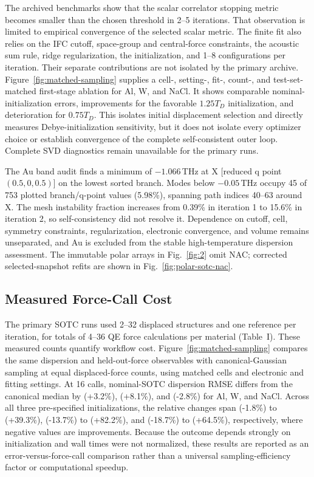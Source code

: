 \documentclass[aps,prb,reprint,amsmath,amssymb,floatfix]{revtex4-2}
\begin{document}
The archived benchmarks show that the scalar correlator stopping metric becomes
smaller than the chosen threshold in 2--5 iterations. That observation is
limited to empirical convergence of the selected scalar metric. The
finite fit also relies on the IFC cutoff, space-group and central-force
constraints, the acoustic sum rule, ridge regularization, the initialization,
and 1--8 configurations per iteration. Their separate contributions are not
isolated by the primary archive. Figure~\ref{fig:matched-sampling} supplies a
cell-, setting-, fit-, count-, and test-set-matched first-stage ablation for Al,
W, and NaCl. It shows comparable nominal-initialization errors, improvements
for the favorable \(1.25T_D\) initialization, and deterioration for
\(0.75T_D\). This isolates initial displacement selection and directly measures
Debye-initialization sensitivity, but it does not isolate every optimizer
choice or establish convergence of the complete self-consistent outer loop.
Complete SVD diagnostics remain unavailable for the primary runs.

The Au band audit finds a minimum of \(-1.066\)\,THz at X
[reduced q point \((0.5,0,0.5)\)] on the lowest sorted branch. Modes below
\(-0.05\)\,THz occupy 45 of 753 plotted branch/q-point values (5.98\%),
spanning path indices 40--63 around X. The mesh instability fraction increases
from 0.39\% in iteration 1 to 15.6\% in iteration 2, so self-consistency did
not resolve it. Dependence on cutoff, cell, symmetry constraints,
regularization, electronic convergence, and volume remains unseparated, and Au
is excluded from the stable high-temperature dispersion assessment. The
immutable polar arrays in Fig.~\ref{fig:2} omit NAC; corrected
selected-snapshot refits are shown in Fig.~\ref{fig:polar-sotc-nac}.

\subsection{Measured Force-Call Cost}\label{computational-efficiency}

The primary SOTC runs used 2--32 displaced structures and one reference per
iteration, for totals of 4--36 QE force calculations per material (Table~I).
These measured counts quantify workflow cost. Figure~\ref{fig:matched-sampling}
compares the same dispersion and held-out-force observables with
canonical-Gaussian sampling at equal displaced-force counts, using matched
cells and electronic and fitting settings. At 16 calls, nominal-SOTC dispersion
RMSE differs from the canonical median by (+3.2\%), (+8.1\%), and
(-2.8\%) for Al, W, and NaCl. Across all three pre-specified initializations,
the relative changes span (-1.8\%) to (+39.3\%), (-13.7\%) to
(+82.2\%), and (-18.7\%) to (+64.5\%), respectively, where negative
values are improvements. Because the outcome depends strongly on initialization
and wall times were not normalized, these results are reported as an
error-versus-force-call comparison rather than a universal sampling-efficiency
factor or computational speedup.
\end{document}
